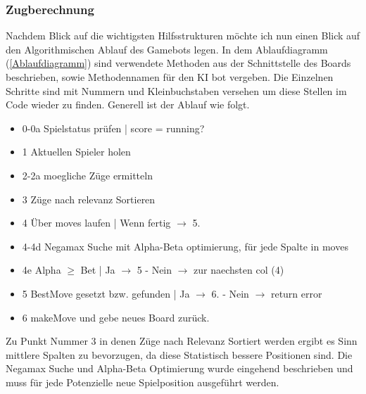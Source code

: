 \subsubsection{Zugberechnung}

Nachdem Blick auf die wichtigsten Hilfsstrukturen möchte ich nun einen Blick auf den Algorithmischen Ablauf des Gamebots legen. In dem Ablaufdiagramm (\ref{Ablaufdiagramm}) sind verwendete Methoden aus der Schnittstelle des Boards beschrieben, sowie Methodennamen für den KI bot vergeben. Die Einzelnen Schritte sind mit Nummern und Kleinbuchstaben versehen um diese Stellen im Code wieder zu finden. 
\newpage
Generell ist der Ablauf wie folgt.
\begin{itemize}
	\item 0-0a Spielstatus prüfen | score = running?
	\item 1 Aktuellen Spieler holen
	\item 2-2a moegliche Züge ermitteln
	\item 3 Züge nach relevanz Sortieren
	\item 4 Über moves laufen | Wenn fertig $\rightarrow$ 5.
	\item 4-4d Negamax Suche mit Alpha-Beta optimierung, für jede Spalte in moves
	\item 4e Alpha $\geq$ Bet | Ja $\rightarrow$ 5 - Nein $\rightarrow$ zur naechsten col (4)
	\item 5 BestMove gesetzt bzw. gefunden | Ja $\rightarrow$ 6. - Nein $\rightarrow$ return error
	\item 6 makeMove und gebe neues Board zurück.
\end{itemize}

Zu Punkt Nummer 3 in denen Züge nach Relevanz Sortiert werden ergibt es Sinn mittlere Spalten zu bevorzugen, da diese Statistisch bessere Positionen sind. Die Negamax Suche und Alpha-Beta Optimierung wurde eingehend beschrieben und muss für jede Potenzielle neue Spielposition ausgeführt werden.
\newpage
